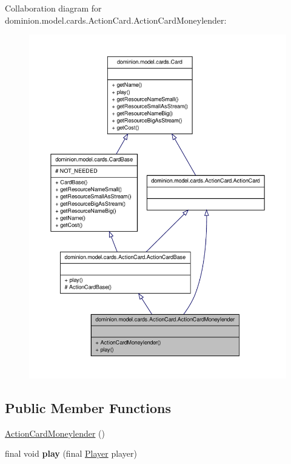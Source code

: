 \-Collaboration diagram for dominion.\-model.\-cards.\-Action\-Card.\-Action\-Card\-Moneylender\-:
\nopagebreak
\begin{figure}[H]
\begin{center}
\leavevmode
\includegraphics[width=350pt]{classdominion_1_1model_1_1cards_1_1ActionCard_1_1ActionCardMoneylender__coll__graph}
\end{center}
\end{figure}
\subsection*{\-Public \-Member \-Functions}
\begin{DoxyCompactItemize}
\item 
\hyperlink{classdominion_1_1model_1_1cards_1_1ActionCard_1_1ActionCardMoneylender_aa77df1e284ef6af522d4d3de1c1694ca}{\-Action\-Card\-Moneylender} ()
\item 
\hypertarget{classdominion_1_1model_1_1cards_1_1ActionCard_1_1ActionCardMoneylender_a4976e031dd321b15f66697f79f75b47d}{final void {\bfseries play} (final \hyperlink{interfacedominion_1_1model_1_1Player}{\-Player} player)}\label{classdominion_1_1model_1_1cards_1_1ActionCard_1_1ActionCardMoneylender_a4976e031dd321b15f66697f79f75b47d}

\end{DoxyCompactItemize}


